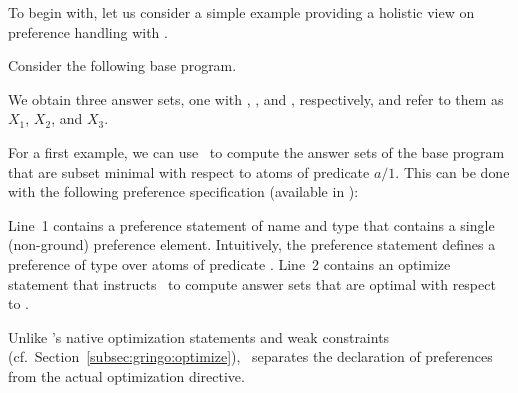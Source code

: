 To begin with,
let us consider a simple example providing a holistic view on preference handling with \asprin.
%
\begin{example}
\label{asprin:example1}
Consider the following base program.
%

%
We obtain three answer sets, one with , , and , respectively,
and refer to them as $X_1$, $X_2$, and $X_3$.

For a first example,
we can use \asprin\ to compute the answer sets of the base program that are subset minimal with respect to atoms of predicate $a/1$. 
This can be done with the following preference specification 
(available in ): 
%

%
Line~1 contains a preference statement of name  and type  that contains a single (non-ground) preference element.
Intuitively, the preference statement  defines a preference of type  over atoms of predicate . 
Line~2 contains an optimize statement that instructs \asprin\ to compute answer sets that are optimal with respect to . 

\begin{note}
Unlike \gringo's native optimization statements and weak constraints (cf.\ Section~\ref{subsec:gringo:optimize}),
\asprin\ separates the declaration of preferences from the actual optimization directive.
\end{note}


\end{example}
